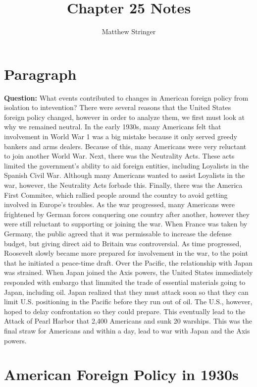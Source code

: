 \documentclass[12pt]{article} %
\title{Chapter 25 Notes} %
\author{Matthew Stringer} %
\begin{document}
	\maketitle
	\tableofcontents
	\newpage
	\section{Paragraph}
	\textbf{Question:} What events contributed to changes in American foreign policy from isolation to intevention? \newline
	There were several reasons that the United States foreign policy changed, however in order to analyze them,
	we first must look at why we remained neutral. In the early 1930s, many Americans felt that involvement in 
	World War 1 was a big mistake because it only served greedy bankers and arms dealers. Because of this, many 
	Americans were very reluctant to join another World War. Next, there was the Neutrality Acts. These acts limited
	the government's ability to aid foreign entities, including Loyalists in the Spanish Civil War. Although many
	Americans wanted to assist Loyalists in the war, however, the Neutrality Acts forbade this. Finally, there was 
	the America First Commitee, which rallied people around the country to avoid getting involved in Europe's troubles.
	As the war progressed, many Americans were frightened by German forces conquering one country after another, however
	they were still reluctant to supporting or joining the war. When France was taken by Germany, the public agreed that
	it was permissable to increase the defense budget, but giving direct aid to Britain was controversial. As time 
	progressed, Roosevelt slowly became more prepared for involvement in the war, to the point that he initiated 
	a peace-time draft. Over the Pacific, the relationship with Japan was strained. When Japan joined the Axis powers,
	the United States immediately responded with embargo that limmited the trade of essential materials going to Japan,
	including oil. Japan realized that they must attack soon so that they can limit U.S. positioning in the Pacific 
	before they run out of oil. The U.S., however, hoped to delay confrontation so they could prepare. This eventually
	lead to the Attack of Pearl Harbor that 2,400 Americans and sunk 20 warships. This was the final straw for Americans 
	and within a day, lead to war with Japan and the Axis powers.
	\newpage

	\section{American Foreign Policy in 1930s}
\end{document}
